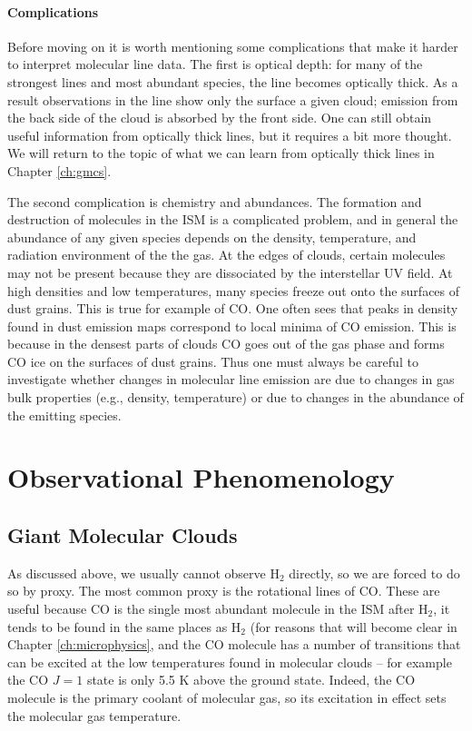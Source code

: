 \paragraph{Complications}

Before moving on it is worth mentioning some complications that make it harder to interpret molecular line data. The first is optical depth: for many of the strongest lines and most abundant species, the line becomes optically thick. As a result observations in the line show only the surface a given cloud; emission from the back side of the cloud is absorbed by the front side. One can still obtain useful information from optically thick lines, but it requires a bit more thought. We will return to the topic of what we can learn from optically thick lines in Chapter \ref{ch:gmcs}.

The second complication is chemistry and abundances. The formation and destruction of molecules in the ISM is a complicated problem, and in general the abundance of any given species depends on the density, temperature, and radiation environment of the the gas. At the edges of clouds, certain molecules may not be present because they are dissociated by the interstellar UV field. At high densities and low temperatures, many species freeze out onto the surfaces of dust grains. This is true for example of CO. One often sees that peaks in density found in dust emission maps correspond to local minima of CO emission. This is because in the densest parts of clouds CO goes out of the gas phase and forms CO ice on the surfaces of dust grains.  Thus one must always be careful to investigate whether changes in molecular line emission are due to changes in gas bulk properties (e.g., density, temperature) or due to changes in the abundance of the emitting species.


\section{Observational Phenomenology}

\subsection{Giant Molecular Clouds}

As discussed above, we usually cannot observe H$_2$ directly, so we are forced to do so by proxy. The most common proxy is the rotational lines of CO. These are useful because CO is the single most abundant molecule in the ISM after H$_2$, it tends to be found in the same places as H$_2$ (for reasons that will become clear in Chapter \ref{ch:microphysics}, and the CO molecule has a number of transitions that can be excited at the low temperatures found in molecular clouds -- for example the CO $J=1$ state is only 5.5 K above the ground state. Indeed, the CO molecule is the primary coolant of molecular gas, so its excitation in effect sets the molecular gas temperature. 


